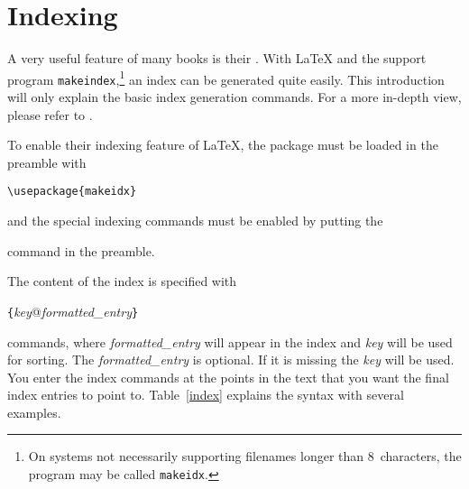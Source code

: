 
\section{Indexing} \label{sec:indexing}
A very useful feature of many books is their . With \LaTeX{}
and the support program \texttt{makeindex},\footnote{On systems not
  necessarily supporting
  filenames longer than 8~characters, the program may be called
  \texttt{makeidx}.} an index can be generated quite easily.  This
introduction will only explain the basic index generation commands.
For a more in-depth view, please refer to \companion.   

To enable their indexing feature of \LaTeX{}, the  package
must be loaded in the preamble with
\begin{lscommand}
\verb|\usepackage{makeidx}|
\end{lscommand}
\noindent and the special indexing commands must be enabled by putting
the
\begin{lscommand}
\end{lscommand}
\noindent command in the preamble.

The content of the index is specified with
\begin{lscommand}
  \verb|{|\emph{key}@\emph{formatted\_entry}\verb|}|
\end{lscommand}
\noindent commands, where \emph{formatted\_entry} will appear in the index
and \emph{key} will be used for sorting.  The \emph{formatted\_entry} is
optional. If it is missing the \emph{key} will be used. You enter the index
commands at the points in the text that you want the final index entries to
point to.  Table~\ref{index} explains the syntax with several examples.

